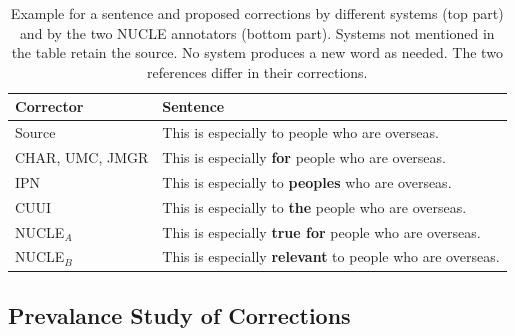 \documentclass[a4paper, 11pt]{article}
\begin{document}
\begin{table}
	\vspace{-0.5cm}
	\centering
	\small
	\singlespacing
	\begin{tabular}{l|p{4cm}}
		Corrector & Sentence \\
		\hline
		Source & This is especially to people who are overseas. \\
		\hline 
		CHAR, UMC, JMGR & This is especially \textbf{for} people who are overseas. \\ 
		IPN & This is especially to \textbf{peoples} who are overseas. \\ 
		CUUI &  This is especially to \textbf{the} people who are overseas. \\ 
		\hline
		NUCLE$_A$ & This is especially \textbf{true for} people who are overseas.\\
		NUCLE$_B$ & This is especially \textbf{relevant} to people who are overseas.
	\end{tabular}
	\caption{\label{tab:nucle_example} Example for a sentence and proposed corrections by different systems (top part) and by the two NUCLE annotators (bottom part). Systems not mentioned in the table retain the source. No system produces a new word as needed. The two references differ in their corrections.} 
	\vspace{-0.5cm}
\end{table} 
%
%

\vspace{-.2cm}
\subsection{Prevalance Study of Corrections}
\end{document}
